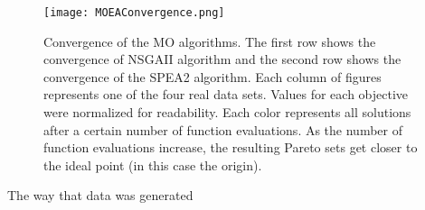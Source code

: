 \documentclass[twocolumn, 9pt]{article}
\begin{document}
\begin{figure}[ht]
    \centering
    \texttt{[image: MOEAConvergence.png]}
    \caption{Convergence of the MO algorithms. The first row shows the convergence of NSGAII algorithm and the second row shows the convergence of the SPEA2 algorithm. Each column of figures represents one of the four real data sets. Values for each objective were normalized for readability. Each color represents all solutions after a certain number of function evaluations. As the number of function evaluations increase, the resulting Pareto sets get closer to the ideal point (in this case the origin).}
    \label{fig:MOEAConvergence}
\end{figure}

\indent{} The way that data was generated 
\end{document}
